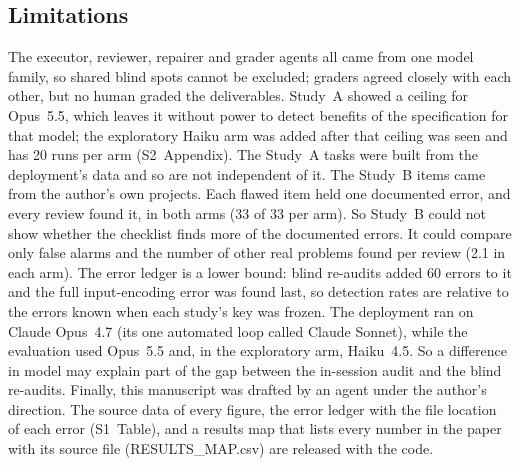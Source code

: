 \documentclass[10pt,letterpaper]{article}
\begin{document}
\subsection*{Limitations}
The executor, reviewer, repairer and grader agents all came from one model
family, so shared blind spots cannot be excluded; graders agreed closely
with each other, but no human graded the deliverables. Study~A showed a
ceiling for Opus~5.5, which leaves it without power to detect benefits of
the specification for that model; the exploratory Haiku arm was added
after that ceiling was seen and has 20 runs per arm (S2~Appendix). The Study~A tasks were built from the
deployment's data and so are not independent of it. The Study~B items
came from the author's own projects. Each flawed item held one documented
error, and every review found it, in both arms (33 of 33 per arm). So
Study~B could not show whether the checklist finds more of the documented
errors. It could compare only false alarms and the number of other real
problems found per review (2.1 in each arm). The error ledger is a lower bound:
blind re-audits added 60 errors to it and the full input-encoding error was
found last, so detection rates are relative to the errors known when
each study's key was frozen. The deployment ran on Claude Opus~4.7 (its
one automated loop called Claude Sonnet), while the evaluation used
Opus~5.5 and, in the exploratory arm, Haiku~4.5. So a difference in
model may explain part of the gap between the in-session audit and the
blind re-audits. Finally, this manuscript
was drafted by an agent under the author's direction. The source data of
every figure, the error ledger with the file location of each error
(S1~Table), and a results map that lists every number in the paper with
its source file (RESULTS\_MAP.csv) are released with the code.
\end{document}
